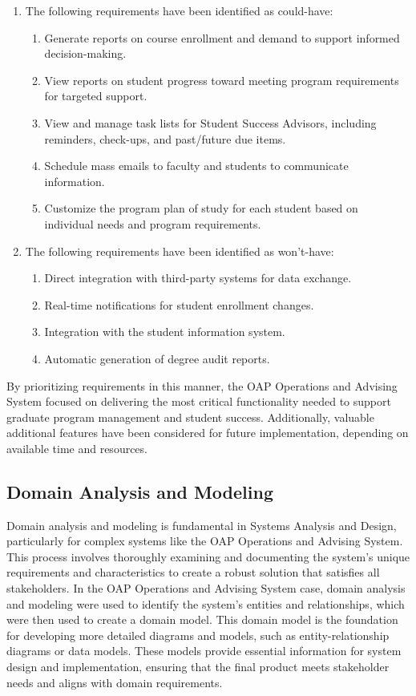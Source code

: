 \documentclass[12pt]{article}
\begin{document}
\begin{enumerate}[label=(\roman*)]
    \item The following requirements have been identified as could-have:
    \begin{enumerate}
        \item Generate reports on course enrollment and demand to support informed decision-making.
        \item View reports on student progress toward meeting program requirements for targeted support.
        \item View and manage task lists for Student Success Advisors, including reminders, check-ups, and past/future due items.
        \item Schedule mass emails to faculty and students to communicate information.
        \item Customize the program plan of study for each student based on individual needs and program requirements.
    \end{enumerate}

    \item The following requirements have been identified as won't-have:
    \begin{enumerate}
        \item Direct integration with third-party systems for data exchange.
        \item Real-time notifications for student enrollment changes.
        \item Integration with the student information system.
        \item Automatic generation of degree audit reports.
    \end{enumerate}
\end{enumerate}

By prioritizing requirements in this manner, the OAP Operations and Advising System focused on delivering the most critical functionality needed to support graduate program management and student success. Additionally, valuable additional features have been considered for future implementation, depending on available time and resources.

\subsection{Domain Analysis and Modeling} 
Domain analysis and modeling is fundamental in Systems Analysis and Design, particularly for complex systems like the OAP Operations and Advising System. This process involves thoroughly examining and documenting the system's unique requirements and characteristics to create a robust solution that satisfies all stakeholders. In the OAP Operations and Advising System case, domain analysis and modeling were used to identify the system's entities and relationships, which were then used to create a domain model. This domain model is the foundation for developing more detailed diagrams and models, such as entity-relationship diagrams or data models. These models provide essential information for system design and implementation, ensuring that the final product meets stakeholder needs and aligns with domain requirements.
\end{document}
